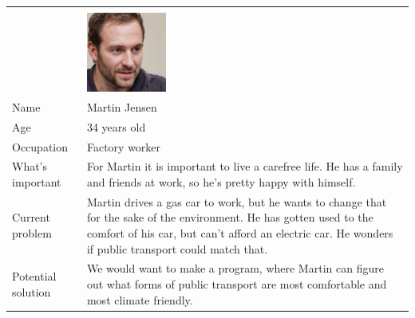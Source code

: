 \noindent
\begin{tabularx}{\textwidth}{ | l X | }
    \hline
    &                                                       \\
    & \includegraphics[width=0.25\textwidth]{images/martin} \\
    Name       & Martin Jensen                                         \\
    Age        & 34 years old                                          \\
    Occupation & Factory worker                                        \\
    What's important & For Martin it is important to live a carefree life.
    He has a family and friends at work, so he's pretty happy with himself. \\
    Current problem & Martin drives a gas car to work, but he wants to change that for the sake of the environment.
    He has gotten used to the comfort of his car, but can't afford an electric car.
    He wonders if public transport could match that. \\
    Potential solution & We would want to make a program, where Martin can figure out what forms of public transport are
    most comfortable and most climate friendly. \\
    \hline
\end{tabularx}
